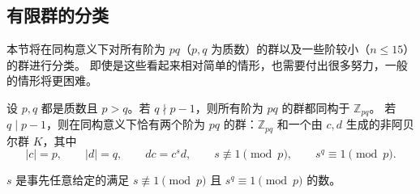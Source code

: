 \subsection{有限群的分类}\label{sec:finite-group-classification}


\begin{purplenote}
本节将在同构意义下对所有阶为 $pq$（$p,q$ 为质数）的群以及一些阶较小（$n\leq15$）的群进行分类。
即使是这些看起来相对简单的情形，也需要付出很多努力，一般的情形将更困难。
\end{purplenote}

\begin{proposition}\label{prop:groups-of-order-pq}
设 $p,q$ 都是质数且 $p>q$。若 $q\nmid p-1$，则所有阶为 $pq$ 的群都同构于 $\mathbb Z_{pq}$。
若 $q\mid p-1$，则在同构意义下恰有两个阶为 $pq$ 的群：$\mathbb Z_{pq}$ 和一个由 $c,d$ 生成的非阿贝尔群 $K$，其中
\[
  |c|=p,\qquad |d|=q,\qquad dc=c^s d,\qquad
  s\not\equiv1\pmod p,\qquad s^q\equiv1\pmod p.
\]
\end{proposition}

\begin{purplenote}
$s$ 是事先任意给定的满足 $s\not\equiv1\pmod p$ 且 $s^q\equiv1\pmod p$ 的数。
\end{purplenote}

